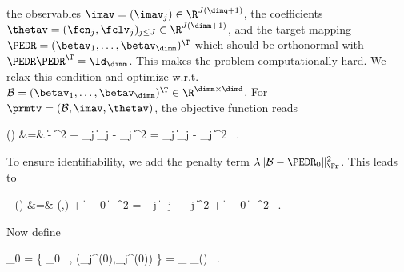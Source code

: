 the observables \( \imav = (\imav_{j}) \in \R^{J(\dimq+1)} \), 
the coefficients \( \thetav = (\fcn_{j},\fclv_{j})_{j \leq J} \in \R^{J(\dimm+1)} \),
and the target mapping \( \PEDR = (\betav_{1},\ldots,\betav_{\dimm})^{\T} \)
which should be orthonormal with \( \PEDR \PEDR^{\T} = \Id_{\dimm} \).
This makes the problem computationally hard.
We relax this condition and optimize w.r.t. \( \BEDR = (\betav_{1},\ldots,\betav_{\dimm})^{\T} \in \R^{\dimm \times \dimd} \). 
For \( \prmtv = (\BEDR,\imav,\thetav) \), the objective function reads
\begin{EQA}
	\LL(\prmtv)
	&=&
	 \| \Imav - \imav \|^{2} 
	+  \sum_{j} 
	\Bigl\| \imav_{j} - \KSe_{j}  
	\Bigr\|^{2} 
	=
	 \sum_{j} \biggl\| \Imav_{j} - \KSe_{j}  \biggr\|^{2}	
	\, .
	\qquad
\label{gtgyuy6ew5dtde32322jtmi}
\end{EQA}
To ensure identifiability, we add the penalty term \( \lambda \| \BEDR - \PEDR_{0} \|_{\Fr}^{2} \).
This leads to
\begin{EQA}
	\LL_{\lambda}(\prmtv)
	&=&
	\LL(\PEDR,\thetav) +   \| \BEDR - \PEDR_{0} \|_{\Fr}^{2}
	=
	 \sum_{j} \biggl\| \Imav_{j} - \KSe_{j}  \biggr\|^{2} 
	+  \| \BEDR - \PEDR_{0} \|_{\Fr}^{2}
	\, .
\label{gtgyuy6ew5dtde32322jtmiG}
\end{EQA}
Now define
\begin{EQA}[c]
	\prmtv_{0}
	= 
	\{ \BEDR_{0} \, , (\fcn_{j}^{(0)},\fclv_{j}^{(0)}) \} 
	=
	\arginf_{\prmtv} \LL_{\lambda}(\prmtv)
	\, .
\end{EQA}

